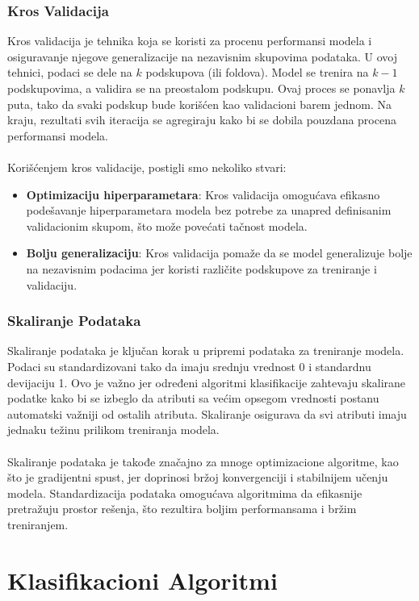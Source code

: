 \documentclass[a4paper,12pt]{article}
\begin{document}
\subsubsection{Kros Validacija}
Kros validacija je tehnika koja se koristi za procenu performansi modela i osiguravanje njegove generalizacije na nezavisnim skupovima podataka. U ovoj tehnici, podaci se dele na $k$ podskupova (ili foldova). Model se trenira na $k-1$ podskupovima, a validira se na preostalom podskupu. Ovaj proces se ponavlja $k$ puta, tako da svaki podskup bude korišćen kao validacioni barem jednom. Na kraju, rezultati svih iteracija se agregiraju kako bi se dobila pouzdana procena performansi modela.\\\\
Korišćenjem kros validacije, postigli smo nekoliko stvari:
\begin{itemize}
    \item \textbf{Optimizaciju hiperparametara}: Kros validacija omogućava efikasno podešavanje hiperparametara modela bez potrebe za unapred definisanim validacionim skupom, što može povećati tačnost modela.
    \item \textbf{Bolju generalizaciju}: Kros validacija pomaže da se model generalizuje bolje na nezavisnim podacima jer koristi različite podskupove za treniranje i validaciju.
\end{itemize}

\subsubsection{Skaliranje Podataka}
Skaliranje podataka je ključan korak u pripremi podataka za treniranje modela. Podaci su standardizovani tako da imaju srednju vrednost 0 i standardnu devijaciju 1. Ovo je važno jer određeni algoritmi klasifikacije zahtevaju skalirane podatke kako bi se izbeglo da atributi sa većim opsegom vrednosti postanu automatski važniji od ostalih atributa. Skaliranje osigurava da svi atributi imaju jednaku težinu prilikom treniranja modela.\\\\
Skaliranje podataka je takođe značajno za mnoge optimizacione algoritme, kao što je gradijentni spust, jer doprinosi bržoj konvergenciji i stabilnijem učenju modela. Standardizacija podataka omogućava algoritmima da efikasnije pretražuju prostor rešenja, što rezultira boljim performansama i bržim treniranjem.



\section{Klasifikacioni Algoritmi}
\end{document}
